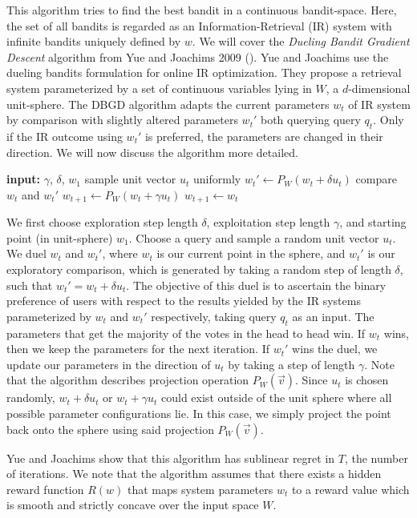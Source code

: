 \documentclass[
  letterpaper,
  DIV=11,
  numbers=noendperiod,
  oneside]{scrreprt}
\theoremstyle{remark}
\begin{document}
This algorithm tries to find the best bandit in a continuous
bandit-space. Here, the set of all bandits is regarded as an
Information-Retrieval (IR) system with infinite bandits uniquely defined
by \(w\). We will cover the \emph{Dueling Bandit Gradient Descent}
algorithm from Yue and Joachims 2009 (). Yue and Joachims use the dueling bandits formulation for online
IR optimization. They propose a retrieval system parameterized by a set
of continuous variables lying in \(W\), a \(d\)-dimensional unit-sphere.
The DBGD algorithm adapts the current parameters \(w_t\) of IR system by
comparison with slightly altered parameters \(w_t'\) both querying query
\(q_t\). Only if the IR outcome using \(w_t'\) is preferred, the
parameters are changed in their direction. We will now discuss the
algorithm more detailed.

\textbf{input:} \(\gamma\), \(\delta\), \(w_1\) sample unit vector
\(u_t\) uniformly \(w_t' \gets P_W(w_t + \delta u_t)\) compare \(w_t\)
and \(w_t'\) \(w_{t+1} \gets P_W(w_t + \gamma u_t)\)
\(w_{t+1} \gets w_t\)

We first choose exploration step length \(\delta\), exploitation step
length \(\gamma\), and starting point (in unit-sphere) \(w_1\). Choose a
query and sample a random unit vector \(u_t\). We duel \(w_t\) and
\(w_t'\), where \(w_t\) is our current point in the sphere, and \(w_t'\)
is our exploratory comparison, which is generated by taking a random
step of length \(\delta\), such that \(w_t' = w_t + \delta u_t\). The
objective of this duel is to ascertain the binary preference of users
with respect to the results yielded by the IR systems parameterized by
\(w_t\) and \(w_t'\) respectively, taking query \(q_t\) as an input. The
parameters that get the majority of the votes in the head to head win.
If \(w_t\) wins, then we keep the parameters for the next iteration. If
\(w_t'\) wins the duel, we update our parameters in the direction of
\(u_t\) by taking a step of length \(\gamma\). Note that the algorithm
describes projection operation \(P_W(\overrightarrow{v})\). Since
\(u_t\) is chosen randomly, \(w_t + \delta u_t\) or \(w_t + \gamma u_t\)
could exist outside of the unit sphere where all possible parameter
configurations lie. In this case, we simply project the point back onto
the sphere using said projection \(P_W(\overrightarrow{v})\).

Yue and Joachims show that this algorithm has sublinear regret in \(T\),
the number of iterations. We note that the algorithm assumes that there
exists a hidden reward function \(R(w)\) that maps system parameters
\(w_t\) to a reward value which is smooth and strictly concave over the
input space \(W\).
\end{document}
